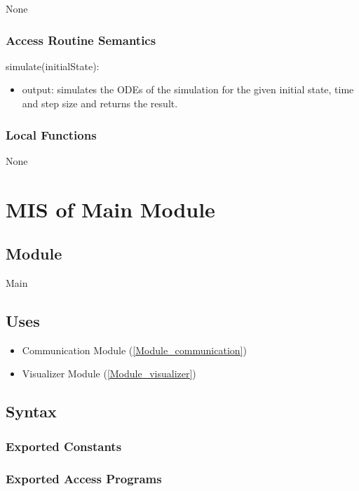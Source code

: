 \documentclass[12pt, titlepage]{article}
\begin{document}
None

\subsubsection{Access Routine Semantics}

\noindent simulate(initialState):
\begin{itemize}
\item output: simulates the ODEs of the simulation for the given initial state, time and step size and returns the result.
\end{itemize}

\subsubsection{Local Functions}

None

\newpage

\section{MIS of Main Module} \label{Module_main}
\subsection{Module}

Main

\subsection{Uses}

\begin{itemize}
  \item Communication Module (\ref{Module_communication})
  \item Visualizer Module (\ref{Module_visualizer})
\end{itemize}

\subsection{Syntax}

\subsubsection{Exported Constants}

\subsubsection{Exported Access Programs}
\end{document}
